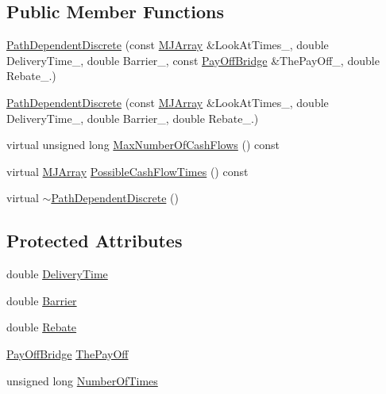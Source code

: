 \subsection*{Public Member Functions}
\begin{DoxyCompactItemize}
\item 
\hyperlink{classPathDependentDiscrete_a03466dd6f04f91e19bfd48aaca428245}{Path\+Dependent\+Discrete} (const \hyperlink{classMJArray}{M\+J\+Array} \&Look\+At\+Times\+\_\+, double Delivery\+Time\+\_\+, double Barrier\+\_\+, const \hyperlink{classPayOffBridge}{Pay\+Off\+Bridge} \&The\+Pay\+Off\+\_\+, double Rebate\+\_.)
\item 
\hyperlink{classPathDependentDiscrete_a4744ebcda027631181ce48d63c1e15e8}{Path\+Dependent\+Discrete} (const \hyperlink{classMJArray}{M\+J\+Array} \&Look\+At\+Times\+\_\+, double Delivery\+Time\+\_\+, double Barrier\+\_\+, double Rebate\+\_.)
\item 
virtual unsigned long \hyperlink{classPathDependentDiscrete_a1e320feec16a1a2b222b3e84266d7282}{Max\+Number\+Of\+Cash\+Flows} () const
\item 
virtual \hyperlink{classMJArray}{M\+J\+Array} \hyperlink{classPathDependentDiscrete_aabb04f6c6027547a879ea765eb90675d}{Possible\+Cash\+Flow\+Times} () const
\item 
virtual \hyperlink{classPathDependentDiscrete_a22f40a8bd13e87058619a76abe31c71e}{$\sim$\+Path\+Dependent\+Discrete} ()
\end{DoxyCompactItemize}
\subsection*{Protected Attributes}
\begin{DoxyCompactItemize}
\item 
double \hyperlink{classPathDependentDiscrete_a2f46a274471efeff2affc3f893c8e157}{Delivery\+Time}
\item 
double \hyperlink{classPathDependentDiscrete_ae82fb16f2f850433be138080dea98435}{Barrier}
\item 
double \hyperlink{classPathDependentDiscrete_a1016842b49bbd92ac77f67934b0adda3}{Rebate}
\item 
\hyperlink{classPayOffBridge}{Pay\+Off\+Bridge} \hyperlink{classPathDependentDiscrete_ab2486c33ea83f1f7bdd7900438e1e454}{The\+Pay\+Off}
\item 
unsigned long \hyperlink{classPathDependentDiscrete_a276c3260066ef1816e2321ac9aa41ff5}{Number\+Of\+Times}
\end{DoxyCompactItemize}


